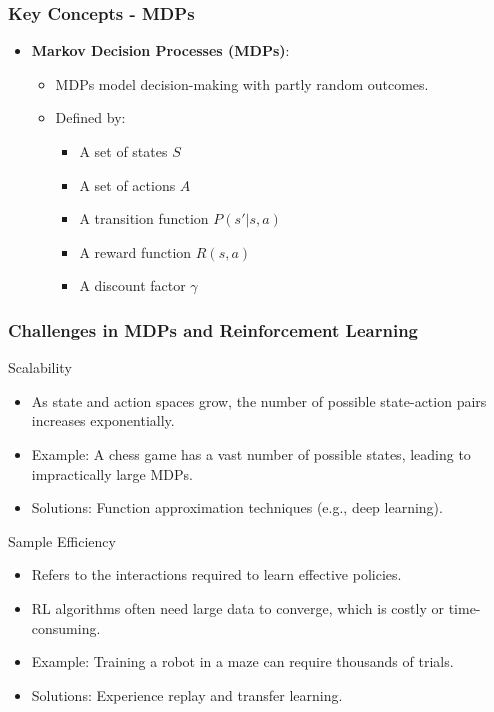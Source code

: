 \documentclass[aspectratio=169]{beamer}
\begin{document}
\begin{frame}[fragile]
    \frametitle{Key Concepts - MDPs}
    \begin{itemize}
        \item \textbf{Markov Decision Processes (MDPs)}:
        \begin{itemize}
            \item MDPs model decision-making with partly random outcomes.
            \item Defined by:
            \begin{itemize}
                \item A set of states \( S \)
                \item A set of actions \( A \)
                \item A transition function \( P(s'|s,a) \)
                \item A reward function \( R(s,a) \)
                \item A discount factor \( \gamma \)
            \end{itemize}
        \end{itemize}
    \end{itemize}
\end{frame}

\begin{frame}[fragile]
    \frametitle{Challenges in MDPs and Reinforcement Learning}
    \begin{block}{Scalability}
        \begin{itemize}
            \item As state and action spaces grow, the number of possible state-action pairs increases exponentially.
            \item Example: A chess game has a vast number of possible states, leading to impractically large MDPs.
            \item Solutions: Function approximation techniques (e.g., deep learning).
        \end{itemize}
    \end{block}
    
    \begin{block}{Sample Efficiency}
        \begin{itemize}
            \item Refers to the interactions required to learn effective policies.
            \item RL algorithms often need large data to converge, which is costly or time-consuming.
            \item Example: Training a robot in a maze can require thousands of trials.
            \item Solutions: Experience replay and transfer learning.
        \end{itemize}
    \end{block}
\end{frame}
\end{document}
